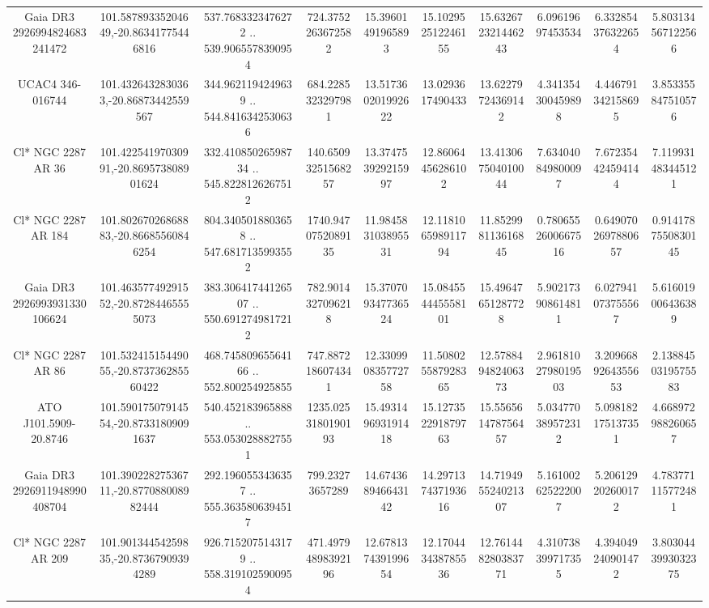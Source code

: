 \begin{table}
\begin{tabular}{cccccccccc}
Gaia DR3 2926994824683241472 & 101.58789335204649,-20.86341775446816 & 537.7683323476272 .. 539.9065578390954 & 724.3752263672582 & 15.39601491965893 & 15.102952512246155 & 15.632672321446243 & 6.09619697453534 & 6.332854376322654 & 5.803134567122566 \\
UCAC4 346-016744 & 101.4326432830363,-20.86873442559567 & 344.9621194249639 .. 544.8416342530636 & 684.2285323297981 & 13.517360201992622 & 13.0293617490433 & 13.62279724369142 & 4.341354300459898 & 4.446791342158695 & 3.853355847510576 \\
Cl* NGC 2287     AR      36 & 101.42254197030991,-20.869573808901624 & 332.41085026598734 .. 545.8228126267512 & 140.65093251568257 & 13.374753929215997 & 12.86064456286102 & 13.413067504010044 & 7.634040849800097 & 7.672354424594144 & 7.119931483445121 \\
Cl* NGC 2287     AR     184 & 101.80267026868883,-20.86685560846254 & 804.3405018803658 .. 547.6817135993552 & 1740.9470752089135 & 11.984583103895531 & 12.118106598911794 & 11.852998113616845 & 0.7806552600667516 & 0.6490702697880657 & 0.9141787550830145 \\
Gaia DR3 2926993931330106624 & 101.46357749291552,-20.87284465555073 & 383.30641744126507 .. 550.6912749817212 & 782.9014327096218 & 15.370709347736524 & 15.084554445558101 & 15.49647651287728 & 5.902173908614811 & 6.027941073755567 & 5.616019006436389 \\
Cl* NGC 2287     AR      86 & 101.53241515449055,-20.873736285560422 & 468.74580965564166 .. 552.800254925855 & 747.8872186074341 & 12.330990835772758 & 11.508025587928365 & 12.578849482406373 & 2.9618102798019503 & 3.2096689264355653 & 2.1388450319575583 \\
ATO J101.5909-20.8746 & 101.59017507914554,-20.87331809091637 & 540.452183965888 .. 553.0530288827551 & 1235.0253180190193 & 15.493149693191418 & 15.127352291879763 & 15.556561478756457 & 5.034770389572312 & 5.098182175137351 & 4.668972988260657 \\
Gaia DR3 2926911948990408704 & 101.39022827536711,-20.877088008982444 & 292.1960553436357 .. 555.3635806394517 & 799.23273657289 & 14.674368946643142 & 14.297137437193616 & 14.719495524021307 & 5.161002625222007 & 5.206129202600172 & 4.783771115772481 \\
Cl* NGC 2287     AR     209 & 101.90134454259835,-20.87367909394289 & 926.7152075143179 .. 558.3191025900954 & 471.49794898392196 & 12.678137439199654 & 12.170443438785536 & 12.761448280383771 & 4.310738399717355 & 4.394049240901472 & 3.8030443993032375 \\

\end{tabular}
\end{table}
